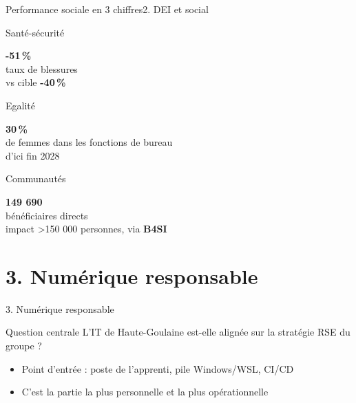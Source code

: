 \documentclass[aspectratio=169,french,12pt]{beamer}
\begin{document}
\begin{frame}{Performance sociale en 3 chiffres}{2. DEI et social}
\noindent
\begin{minipage}[t]{0.31\textwidth}
  \begin{block}{Santé-sécurité\strut}
    \parbox[t][2.5cm]{\linewidth}{%
      \centering
      \huge \textbf{-51\,\%}\normalsize\\[0.15cm]
      taux de blessures\\vs cible \textbf{-40\,\%}%
    }%
  \end{block}
\end{minipage}%
\hfill
\begin{minipage}[t]{0.31\textwidth}
  \begin{block}{Egalit\'e\strut}
    \parbox[t][2.5cm]{\linewidth}{%
      \centering
      \huge \textbf{30\,\%}\normalsize\\[0.15cm]
      de femmes dans les fonctions de bureau\\d'ici fin 2028%
    }%
  \end{block}
\end{minipage}%
\hfill
\begin{minipage}[t]{0.31\textwidth}
  \begin{block}{Communautés\strut}
    \parbox[t][2.5cm]{\linewidth}{%
      \centering
      \huge \textbf{149 690}\normalsize\\[0.15cm]
      bénéficiaires directs\\impact >150 000 personnes, via \textbf{B4SI}%
    }%
  \end{block}
\end{minipage}
\end{frame}

\section{3. Numérique responsable}

\begin{frame}{3. Numérique responsable}
\begin{block}{Question centrale}
L'IT de Haute-Goulaine est-elle alignée sur la stratégie RSE du groupe ?
\end{block}
\vfill
\begin{itemize}
  \item Point d'entrée : poste de l'apprenti, pile Windows/WSL, CI/CD
  \item C'est la partie la plus personnelle et la plus opérationnelle
\end{itemize}
\end{frame}
\end{document}
